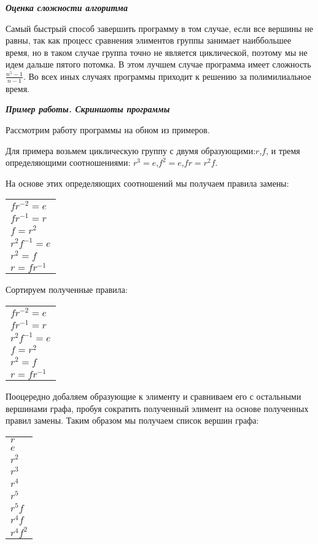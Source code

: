 \begin{center}
  \textbf{\textit{Оценка сложности алгоритма}}
\end{center}

Самый быстрый способ завершить программу в том случае, если все вершины не равны, так как процесс сравнения элиментов группы занимает наиббольшее время, но в таком случае группа точно не является циклической, поэтому мы не идем дальше пятого потомка. В этом лучшем случае программа имеет сложность $ \frac{n^5-1}{n-1}$. Во всех иных случаях программы приходит к решению за полимилиальное время.

\begin{center}
  \textbf{\textit{Пример работы. Скриншоты программы}}
\end{center}

Рассмотрим работу программы на обном из примеров.

Для примера возьмем циклическую группу с двумя образующими:$r$,$f$, и тремя определяющими соотношениями: $r^3=e$,$f^2=e$,$fr=r^2f$.

На основе этих определяющих соотношений мы получаем правила замены:

\begin{tabular}{l}
  $fr^{-2}=e$ \\
  $fr^{-1}=r$ \\
  $f=r^2$ \\
  $r^2f^{-1}=e$ \\
  $r^2=f$ \\
  $r=fr^{-1}$\\
\end{tabular}

Сортируем полученные правила:

\begin{tabular}{l}
  $fr^{-2}=e$ \\
  $fr^{-1}=r$ \\
  $r^2f^{-1}=e$ \\
  $f=r^2$ \\
  $r^2=f$ \\
  $r=fr^{-1}$\\
\end{tabular}

Пооцередно добаляем образующие к элименту и сравниваем его с остальными вершинами графа, пробуя сократить полученный элимент на основе полученных правил замены. Таким образом мы получаем список вершин графа:

\begin{tabular}{l}
  $r$ \\
  $e$ \\
  $r^2$ \\
  $r^3$ \\
  $r^4$ \\
  $r^5$ \\
  $r^5f$ \\
  $r^4f$ \\
  $r^4f^2$ \\
\end{tabular}

